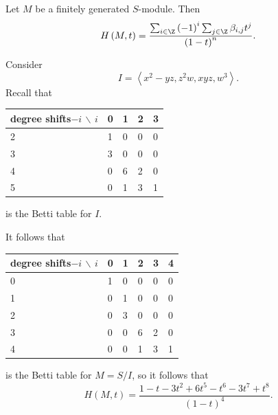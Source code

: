 \documentclass[co439]{subfiles}
\begin{document}
    \begin{prop}{}
        Let $M$ be a finitely generated $S$-module. Then
        \begin{equation*}
            H\left( M,t \right) = \frac{\sum^{}_{i\in\Z}\left( -1 \right)^i\sum^{}_{j\in\Z}\beta_{i,j}t^j}{\left( 1-t \right)^n}.
        \end{equation*}
    \end{prop}

    \rruleline
    
    \begin{example}{}
        Consider
        \begin{equation*}
            I = \left< x^{2}-yz,z^{2}w,xyz,w^{3} \right>. 
        \end{equation*}
        Recall that

        \noindent
        \begin{tabularx}{\textwidth}{|X|X|X|X|X|}
            \hline
            degree shifts$-i$ $\backslash$ $i$ & 0 & 1 & 2 & 3 \\
            \hline
            2 & 1 & 0 & 0 & 0 \\
            3 & 3 & 0 & 0 & 0 \\
            4 & 0 & 6 & 2 & 0 \\
            5 & 0 & 1 & 3 & 1 \\
            \hline
        \end{tabularx}
        is the Betti table for $I$.

        It follows that

        \noindent
        \begin{tabularx}{\textwidth}{|X|X|X|X|X|X|}
            \hline
            degree shifts$-i$ $\backslash$ $i$ & 0 & 1 & 2 & 3 & 4 \\
            \hline
            0 & 1 & 0 & 0 & 0 & 0 \\
            1 & 0 & 1 & 0 & 0 & 0 \\
            2 & 0 & 3 & 0 & 0 & 0 \\
            3 & 0 & 0 & 6 & 2 & 0 \\
            4 & 0 & 0 & 1 & 3 & 1 \\
            \hline
        \end{tabularx}
        is the Betti table for $M=S /I$, so it follows that
        \begin{equation*}
            H\left( M,t \right) = \frac{1-t-3t^{2}+6t^5-t^6-3t^7+t^8}{\left( 1-t \right)^{4}}.
        \end{equation*}
    \end{example}
    
\end{document}
